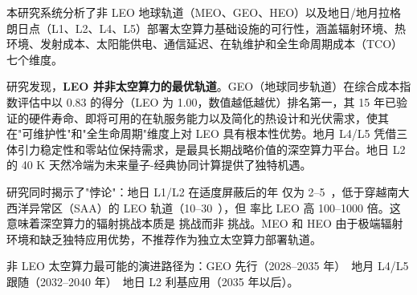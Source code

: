 
本研究系统分析了非 LEO 地球轨道（MEO、GEO、HEO）以及地日/地月拉格朗日点（L1、L2、L4、L5）部署太空算力基础设施的可行性，涵盖辐射环境、热环境、\deltav 发射成本、太阳能供电、通信延迟、在轨维护和全生命周期成本（TCO）七个维度。

研究发现，\textbf{LEO 并非太空算力的最优轨道}。GEO（地球同步轨道）在综合成本指数评估中以 0.83 的得分（LEO 为 1.00，数值越低越优）排名第一，其 15 年已验证的硬件寿命、即将可用的在轨服务能力以及简化的热设计和光伏需求，使其在"可维护性"和"全生命周期"维度上对 LEO 具有根本性优势。地月 L4/L5 凭借三体引力稳定性和零站位保持需求，是最具长期战略价值的深空算力平台。地日 L2 的 40 K 天然冷端为未来量子-经典协同计算提供了独特机遇。

研究同时揭示了"\tid 悖论"：地日 L1/L2 在适度屏蔽后的年 \tid 仅为 2--5~\kradyr，低于穿越南大西洋异常区（SAA）的 LEO 轨道（10--30~\kradyr），但 \seu 率比 LEO 高 100--1000 倍。这意味着深空算力的辐射挑战本质是 \seu 挑战而非 \tid 挑战。MEO 和 HEO 由于极端辐射环境和缺乏独特应用优势，不推荐作为独立太空算力部署轨道。

非 LEO 太空算力最可能的演进路径为：GEO 先行（2028--2035 年）\textrightarrow\ 地月 L4/L5 跟随（2032--2040 年）\textrightarrow\ 地日 L2 利基应用（2035 年以后）。
